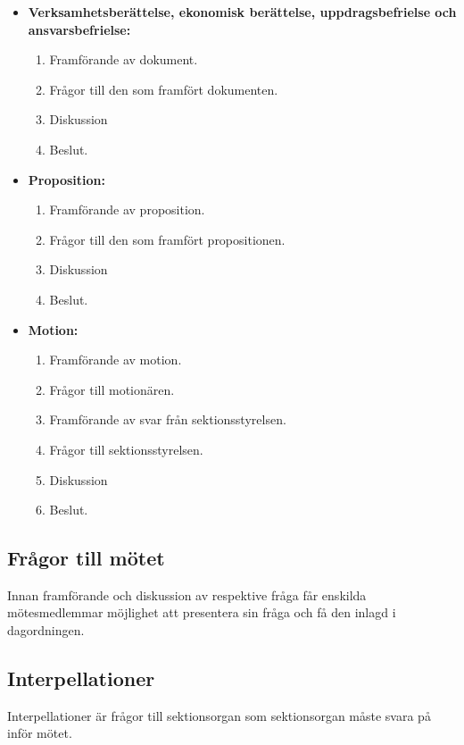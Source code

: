\documentclass[11pt, includeaddress]{classes/cthit}
\begin{document}
\begin{itemize}
\begin{enumerate}
        \item Frågor till den som framfört dokumentet.
        \item Beslut.
    \end{enumerate}
    \item \textbf{Verksamhetsberättelse, ekonomisk berättelse, uppdragsbefrielse och ansvarsbefrielse:}
    \begin{enumerate}
        \item Framförande av dokument.
        \item Frågor till den som framfört dokumenten.
        \item Diskussion
        \item Beslut.
    \end{enumerate}
    \item \textbf{Proposition:}
    \begin{enumerate}
        \item Framförande av proposition.
        \item Frågor till den som framfört propositionen.
        \item Diskussion
        \item Beslut.
    \end{enumerate}
    \item \textbf{Motion:}
    \begin{enumerate}
        \item Framförande av motion.
        \item Frågor till motionären.
        \item Framförande av svar från sektionsstyrelsen.
        \item Frågor till sektionsstyrelsen.
        \item Diskussion
        \item Beslut.
    \end{enumerate}
\end{itemize}
\subsection{Frågor till mötet}
Innan framförande och diskussion av respektive fråga får enskilda mötesmedlemmar möjlighet att presentera sin fråga och få den inlagd i dagordningen.
\subsection{Interpellationer}
Interpellationer är frågor till sektionsorgan som sektionsorgan måste svara på inför mötet.
\end{document}
